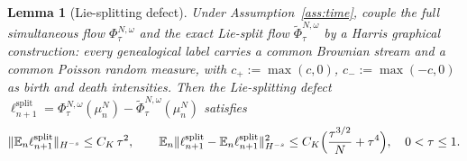 \documentclass[a4paper,fleqn]{cas-sc}
\newtheorem{lemma}[theorem]{Lemma}
\theoremstyle{definition}
\theoremstyle{remark}
\begin{document}
\begin{lemma}[Lie-splitting defect]\label{lem:split}
Under Assumption~\ref{ass:time}, couple the full simultaneous flow
$\Phi^{N,\omega}_\tau$ and the exact Lie-split flow
$\widetilde\Phi^{N,\omega}_\tau$ by a Harris graphical construction: every
genealogical label carries a common Brownian stream and a common Poisson random
measure, with $c_+:=\max(c,0)$, $c_-:=\max(-c,0)$ as birth and death intensities.
Then the Lie-splitting defect $\ell^{\mathrm{split}}_{n+1}
=\Phi^{N,\omega}_\tau(\mu^N_n)-\widetilde\Phi^{N,\omega}_\tau(\mu^N_n)$ satisfies
\begin{equation}\label{eq:split}
\|\mathbb E_n\ell^{\mathrm{split}}_{n+1}\|_{H^{-s}}\le C_K\,\tau^2,
\qquad
\mathbb E_n\|\ell^{\mathrm{split}}_{n+1}-\mathbb E_n\ell^{\mathrm{split}}_{n+1}\|_{H^{-s}}^2
\le C_K\Bigl(\frac{\tau^{3/2}}{N}+\tau^4\Bigr),
\quad 0<\tau\le1.
\end{equation}
\end{lemma}
\end{document}

